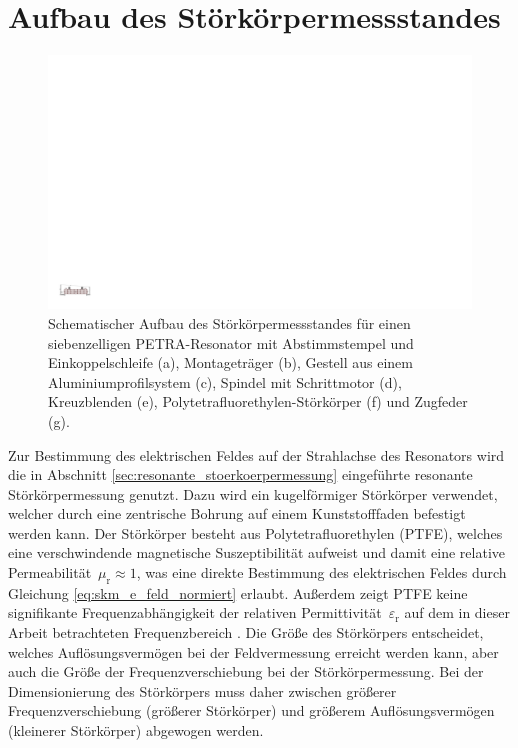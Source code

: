 \section{Aufbau des Störkörpermessstandes}
\label{sec:aufbau_messstand}
\begin{figure}
	\centering
	\includegraphics[width=1.0\textheight]{./figs/cavity/messaufbau.pdf}
	\caption[Schematischer Aufbau des Störkörpermessstandes]{Schematischer Aufbau des Störkörpermessstandes für einen siebenzelligen PETRA-Resonator mit Abstimmstempel und Einkoppelschleife (a), Montageträger (b), Gestell aus einem Aluminiumprofilsystem (c), Spindel mit Schrittmotor (d), Kreuzblenden (e), Polytetrafluorethylen-Störkörper (f) und Zugfeder (g).}
	\label{fig:stoerkoerpermessstand}
\end{figure}
Zur Bestimmung des elektrischen Feldes auf der Strahlachse des Resonators wird die in Abschnitt \ref{sec:resonante_stoerkoerpermessung} eingeführte resonante Störkörpermessung genutzt.
Dazu wird ein kugelförmiger Störkörper verwendet, welcher durch eine zentrische Bohrung auf einem Kunststofffaden befestigt werden kann.
Der Störkörper besteht aus Polytetrafluorethylen (PTFE), welches eine verschwindende magnetische Suszeptibilität aufweist \cite{keyjeff} und damit eine relative Permeabilität~$\mu_\mathrm{r} \approx 1$, was eine direkte Bestimmung des elektrischen Feldes durch Gleichung \eqref{eq:skm_e_feld_normiert} erlaubt.
Außerdem zeigt PTFE keine signifikante Frequenzabhängigkeit der relativen Permittivität~$\varepsilon_\mathrm{r}$ auf dem in dieser Arbeit betrachteten Frequenzbereich \cite[S.\ 2201]{CRC}.
Die Größe des Störkörpers entscheidet, welches Auflösungsvermögen bei der Feldvermessung erreicht werden kann, aber auch die Größe der Frequenzverschiebung bei der Störkörpermessung.
Bei der Dimensionierung des Störkörpers muss daher zwischen größerer Frequenzverschiebung (größerer Störkörper) und größerem Auflösungsvermögen (kleinerer Störkörper) abgewogen werden.

